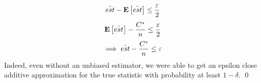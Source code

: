 \documentclass[12pt]{article}
\begin{document}
\begin{solution}
\begin{enumerate}[label=(\alph*)]
    \[
    \Bar{est} - \Exp{\Bar{est}}  \leq \frac{\epsilon}{2}
    \]
    \[
    \Exp{\Bar{est}} - \frac{C^*}{n} \leq \frac{\epsilon}{2}
    \]
    \[
    \implies \Bar{est}- \frac{C^*}{n} \leq \epsilon
    \]
    Indeed, even without an unbiased estimator, we were able to get an epsilon close additive approximation for the true statistic with probability at least $1-\delta$. \qed
   
    
    
\end{enumerate}
\end{solution}
\end{document}
